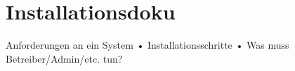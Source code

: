 
\chapter{Installationsdoku}

Anforderungen an ein System
• Installationsschritte
• Was muss Betreiber/Admin/etc. tun?

\newpage



\newpage



\newpage